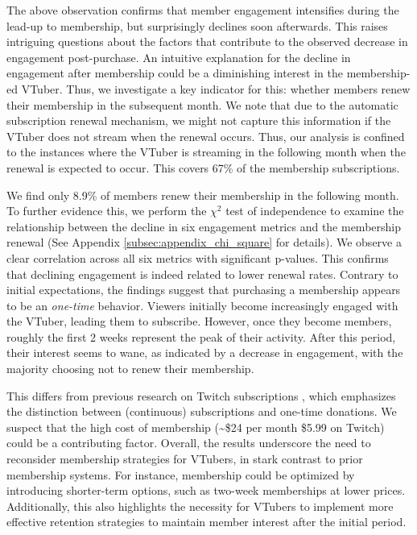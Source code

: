 The above observation confirms that member engagement intensifies during the lead-up to membership, but surprisingly declines soon afterwards. This raises intriguing questions about the factors that contribute to the observed decrease in engagement post-purchase.
An intuitive explanation for the decline in engagement after membership could be a diminishing interest in the membership-ed VTuber.
Thus, we investigate a key indicator for this: whether members renew their membership in the subsequent month. 
We note that due to the automatic subscription renewal mechanism, we might not capture this information if the VTuber does not stream when the renewal occurs. Thus, our analysis is confined to the instances where the VTuber is streaming in the following month when the renewal is expected to occur. This covers 67\% of the membership subscriptions.

We find only 8.9\% of members renew their membership in the following month. To further evidence this, we perform the $\chi^2$ test of independence \cite{pearson1900} to examine the relationship between the decline in six engagement metrics and the membership renewal (See Appendix \ref{subsec:appendix_chi_square} for details). We observe a clear correlation across all six metrics with significant p-values. This confirms that declining engagement is indeed related to lower renewal rates.
Contrary to initial expectations, the findings suggest that purchasing a membership appears to be an \emph{one-time} behavior. Viewers initially become increasingly engaged with the VTuber, leading them to subscribe. However, once they become members, roughly the first 2 weeks represent the peak of their activity. After this period, their interest seems to wane, as indicated by a decrease in engagement, with the majority choosing not to renew their membership.

This differs from previous research on Twitch subscriptions \cite{10.1145/3311350.3347160}, which emphasizes the distinction between (continuous) subscriptions and one-time donations. We suspect that the high cost of membership (\textasciitilde\$24 per month \vs \$5.99 on Twitch) could be a contributing factor. Overall, the results underscore the need to reconsider membership strategies for VTubers, in stark contrast to prior membership systems. For instance, membership could be optimized by introducing shorter-term options, such as two-week memberships at lower prices. Additionally, this also highlights the necessity for VTubers to implement more effective retention strategies to maintain member interest after the initial period.

 




